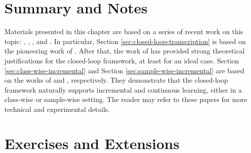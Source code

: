 \documentclass[../../book-main.tex]{subfiles}
\begin{document}
\section{Summary and Notes}
Materials presented in this chapter are based on a series of recent work on this topic: \cite{Dai-entropy-2022}, 
\cite{pai2022pursuit}, \cite{tong2023incremental}, and \cite{pmlr-v234-tong24a}. In particular, Section \ref{sec:closed-loop-transcription} is based on the pioneering work of \cite{Dai-entropy-2022}. After that, the work of \cite{pai2022pursuit} has provided strong theoretical justifications for the closed-loop framework, at least for an ideal case. Section \ref{sec:class-wise-incremental} and Section \ref{sec:sample-wise-incremental} are based on the works of \cite{tong2023incremental} and \cite{pmlr-v234-tong24a}, respectively. They demonstrate that the closed-loop framework naturally supports incremental and continuous learning, either in a class-wise or sample-wise setting. The reader may refer to these papers for more technical and experimental details.

\section{Exercises and Extensions}
\end{document}
